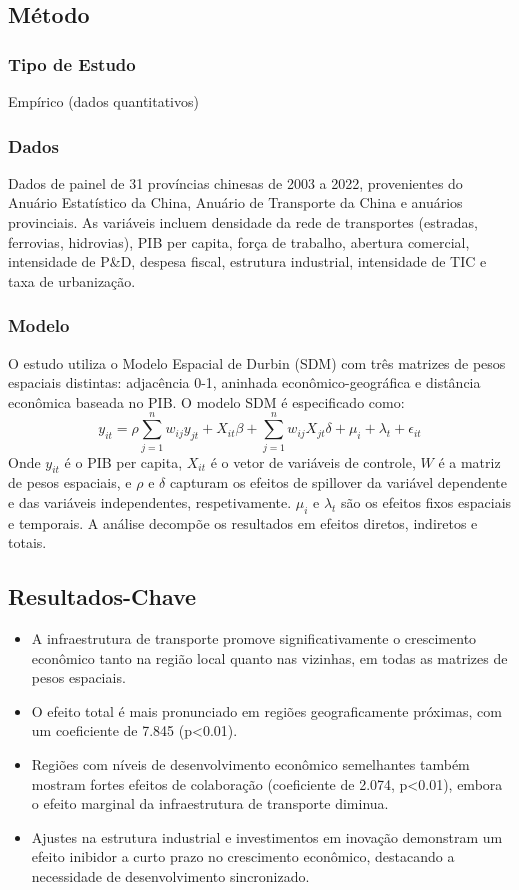 \documentclass[12pt]{article}
\begin{document}
\subsection*{Método}

\subsubsection*{Tipo de Estudo}
Empírico (dados quantitativos)

\subsubsection*{Dados}
Dados de painel de 31 províncias chinesas de 2003 a 2022, provenientes do Anuário Estatístico da China, Anuário de Transporte da China e anuários provinciais. As variáveis incluem densidade da rede de transportes (estradas, ferrovias, hidrovias), PIB per capita, força de trabalho, abertura comercial, intensidade de P\&D, despesa fiscal, estrutura industrial, intensidade de TIC e taxa de urbanização.

\subsubsection*{Modelo}
O estudo utiliza o Modelo Espacial de Durbin (SDM) com três matrizes de pesos espaciais distintas: adjacência 0-1, aninhada econômico-geográfica e distância econômica baseada no PIB. O modelo SDM é especificado como:
\begin{equation*}
y_{it} = \rho \sum_{j=1}^{n} w_{ij} y_{jt} + X_{it}\beta + \sum_{j=1}^{n} w_{ij} X_{jt}\delta + \mu_i + \lambda_t + \epsilon_{it}
\end{equation*}
Onde $y_{it}$ é o PIB per capita, $X_{it}$ é o vetor de variáveis de controle, $W$ é a matriz de pesos espaciais, e $\rho$ e $\delta$ capturam os efeitos de spillover da variável dependente e das variáveis independentes, respetivamente. $\mu_i$ e $\lambda_t$ são os efeitos fixos espaciais e temporais. A análise decompõe os resultados em efeitos diretos, indiretos e totais.

\subsection*{Resultados-Chave}
\begin{itemize}
    \item A infraestrutura de transporte promove significativamente o crescimento econômico tanto na região local quanto nas vizinhas, em todas as matrizes de pesos espaciais.
    \item O efeito total é mais pronunciado em regiões geograficamente próximas, com um coeficiente de 7.845 (p<0.01).
    \item Regiões com níveis de desenvolvimento econômico semelhantes também mostram fortes efeitos de colaboração (coeficiente de 2.074, p<0.01), embora o efeito marginal da infraestrutura de transporte diminua.
    \item Ajustes na estrutura industrial e investimentos em inovação demonstram um efeito inibidor a curto prazo no crescimento econômico, destacando a necessidade de desenvolvimento sincronizado.
\end{itemize}
\end{document}
